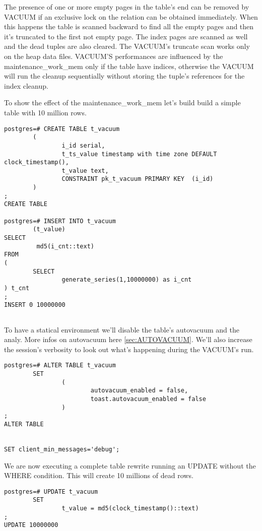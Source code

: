 The presence of one or more empty pages in the table's end can be removed by VACUUM if an 
exclusive lock on the relation can be obtained immediately. When this happens the table is scanned 
backward to find all the empty pages and then it's truncated to the first not empty page. The index 
pages are scanned as well and the dead tuples are also cleared. The VACUUM's truncate scan works 
only on the heap data files. VACUUM'S performances are influenced by the maintenance\_work\_mem 
only if the table have indices, otherwise the VACUUM will run the cleanup sequentially without 
storing the tuple's references for the index cleanup.\newline

To show the effect of the maintenance\_work\_mem  let's build build a simple table with 10 
million rows. 


\begin{lstlisting}[style=pgsql]
postgres=# CREATE TABLE t_vacuum 
        (
                i_id serial,
                t_ts_value timestamp with time zone DEFAULT clock_timestamp(),
                t_value text,
                CONSTRAINT pk_t_vacuum PRIMARY KEY  (i_id)
        )
;
CREATE TABLE

postgres=# INSERT INTO t_vacuum
        (t_value)
SELECT 
         md5(i_cnt::text)
FROM
(
        SELECT
                generate_series(1,10000000) as i_cnt
) t_cnt
;
INSERT 0 10000000


\end{lstlisting}
To have a statical environment we'll disable the table's autovacuum and the analy. More infos on 
autovacuum here 
\ref{sec:AUTOVACUUM}.
We'll also increase the session's verbosity to look out what's happening during the VACUUM's 
 run.\newline
\begin{lstlisting}[style=pgsql]
postgres=# ALTER TABLE t_vacuum 
        SET 
                (
                        autovacuum_enabled = false, 
                        toast.autovacuum_enabled = false
                )
;
ALTER TABLE


SET client_min_messages='debug';

\end{lstlisting}

We are now executing a complete table rewrite running an UPDATE without the WHERE condition. 
This will create 10 millions of dead rows.\newline

\begin{lstlisting}[style=pgsql]
postgres=# UPDATE t_vacuum 
        SET 
                t_value = md5(clock_timestamp()::text)
;
UPDATE 10000000

\end{lstlisting}

